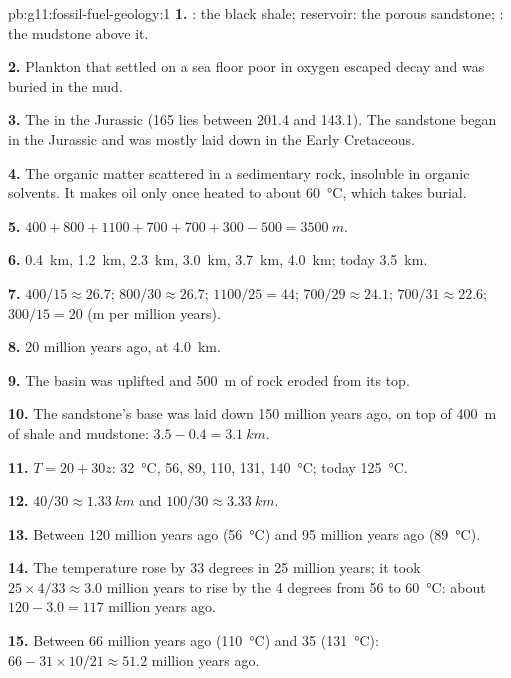 \begin{solution}{pb:g11:fossil-fuel-geology:1}
\textbf{1.} : the black shale; reservoir: the porous sandstone;
: the mudstone above it.

\textbf{2.} Plankton that settled on a sea floor poor in oxygen escaped
decay and was buried in the mud.

\textbf{3.} The  in the Jurassic (165 lies between 201.4 and
143.1). The sandstone began in the Jurassic and was mostly laid down in the
Early Cretaceous.

\textbf{4.} The organic matter scattered in a sedimentary rock, insoluble in
organic solvents. It makes oil only once heated to about
\qty{60}{\degreeCelsius}, which takes burial.

\textbf{5.} $400 + 800 + 1100 + 700 + 700 + 300 - 500 = \qty{3500}{m}$.

\textbf{6.} \qty{0.4}{km}, \qty{1.2}{km}, \qty{2.3}{km}, \qty{3.0}{km},
\qty{3.7}{km}, \qty{4.0}{km}; today \qty{3.5}{km}.

\textbf{7.} $400/15 \approx 26.7$; $800/30 \approx 26.7$; $1100/25 = 44$;
$700/29 \approx 24.1$; $700/31 \approx 22.6$; $300/15 = 20$ (\unit{m} per
million years).

\textbf{8.} 20 million years ago, at \qty{4.0}{km}.

\textbf{9.} The basin was uplifted and \qty{500}{m} of rock eroded from its
top.

\textbf{10.} The sandstone's base was laid down 150 million years ago, on
top of \qty{400}{m} of shale and mudstone: $3.5 - 0.4 = \qty{3.1}{km}$.

\textbf{11.} $T = 20 + 30 z$: \qty{32}{\degreeCelsius}, \num{56}, \num{89},
\num{110}, \num{131}, \qty{140}{\degreeCelsius}; today
\qty{125}{\degreeCelsius}.

\textbf{12.} $40/30 \approx \qty{1.33}{km}$ and $100/30 \approx
\qty{3.33}{km}$.

\textbf{13.} Between 120 million years ago (\qty{56}{\degreeCelsius}) and
95 million years ago (\qty{89}{\degreeCelsius}).

\textbf{14.} The temperature rose by 33 degrees in 25 million years; it took
$25 \times 4/33 \approx 3.0$ million years to rise by the 4 degrees from
\num{56} to \qty{60}{\degreeCelsius}: about $120 - 3.0 = 117$ million years
ago.

\textbf{15.} Between 66 million years ago (\qty{110}{\degreeCelsius}) and
35 (\qty{131}{\degreeCelsius}): $66 - 31 \times 10/21 \approx 51.2$ million
years ago.


\end{solution}
